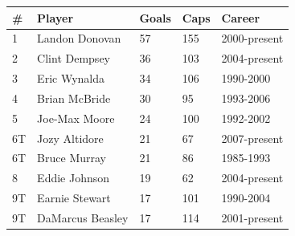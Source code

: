 \documentclass{article}
\begin{document}
\begin{tabular}{lllll}
\toprule
\# & Player & Goals & Caps & Career \\
\midrule
1 & Landon Donovan & 57 & 155 & 2000-present \\
2 & Clint Dempsey & 36 & 103 & 2004-present \\
3 & Eric Wynalda & 34 & 106 & 1990-2000 \\
4 & Brian McBride & 30 & 95 & 1993-2006 \\
5 & Joe-Max Moore & 24 & 100 & 1992-2002 \\
6T & Jozy Altidore & 21 & 67 & 2007-present \\
6T & Bruce Murray & 21 & 86 & 1985-1993 \\
8 & Eddie Johnson & 19 & 62 & 2004-present \\
9T & Earnie Stewart & 17 & 101 & 1990-2004 \\
9T & DaMarcus Beasley & 17 & 114 & 2001-present \\
\bottomrule
\end{tabular}
\end{document}
